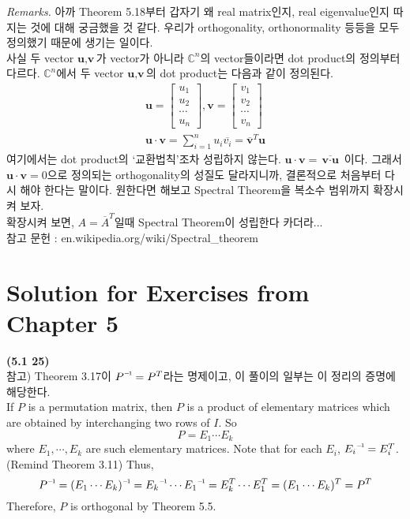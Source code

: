 \textit{Remarks.} 아까 Theorem 5.18부터 갑자기 왜 real matrix인지, real eigenvalue인지 따지는 것에 대해 궁금했을 것 같다. 우리가 orthogonality, orthonormality 등등을 모두  정의했기 때문에 생기는 일이다. \\
사실 두 vector $\textbf{u}, \textbf{v}$가  vector가 아니라 $\mathbb{C}^n$의 vector들이라면 dot product의 정의부터 다르다. $\mathbb{C}^n$에서 두 vector $\textbf{u}, \textbf{v}$의 dot product는 다음과 같이 정의된다.
\begin{align*}
	\textbf{u} = \begin{bmatrix}
		u_1 \\ u_2 \\ \cdots \\ u_n
	\end{bmatrix}, \textbf{v} = \begin{bmatrix}
		v_1 \\ v_2 \\ \cdots \\ v_n
	\end{bmatrix} \\
	\textbf{u} \cdot \textbf{v} = \sum_{i=1}^{n}u_i\overline{v_i} = {\overline{\textbf{v}}}^T\textbf{u}
\end{align*}
여기에서는 dot product의 `교환법칙'조차 성립하지 않는다. $\textbf{u} \cdot \textbf{v} = \overline{\textbf{v} \cdot \textbf{u}}$ 이다.
그래서 $\textbf{u}\cdot\textbf{v}=0$으로 정의되는 orthogonality의 성질도 달라지니까, 결론적으로 처음부터 다시 해야 한다는 말이다. 원한다면 해보고 Spectral Theorem을 복소수 범위까지 확장시켜 보자. \\
확장시켜 보면, $A = {\overline{A}}^T$일때 Spectral Theorem이 성립한다 카더라... \\

참고 문헌 : en.wikipedia.org/wiki/Spectral\_theorem
\iffalse
\section{Solution for Exercises from Chapter 5}
\textbf{(5.1 25)} \\
참고) Theorem 3.17이 $\inv{P} = P^T$라는 명제이고, 이 풀이의 일부는 이 정리의 증명에 해당한다. \\

If $P$ is a permutation matrix, then $P$ is a product of elementary matrices which are obtained by interchanging two rows of $I$. So \begin{equation*}
	P = E_1\cdots E_k
\end{equation*} where $E_1, \cdots, E_k$ are such elementary matrices. Note that for each $E_i$, $\inv{E_i} = E_i^T$. (Remind Theorem 3.11) Thus, \begin{equation*}
	\inv{P} = \inv{(E_1\cdots E_k)} = \inv{E_k}\cdots\inv{E_1} = E_k^T\cdots E_1^T = (E_1\cdots E_k)^T = P^T
\end{equation*}
Therefore, $P$ is orthogonal by Theorem 5.5. \\

